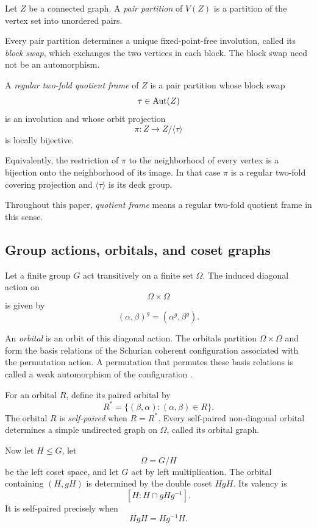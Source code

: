 Let \(Z\) be a connected graph. A \emph{pair partition} of \(V(Z)\) is a
partition of the vertex set into unordered pairs.

Every pair partition determines a unique fixed-point-free involution,
called its \emph{block swap}, which exchanges the two vertices in each
block. The block swap need not be an automorphism.

\begin{definition}
A \emph{regular two-fold quotient frame} of \(Z\) is a pair partition whose
block swap
\[
\tau\in\operatorname{Aut}(Z)
\]
is an involution and whose orbit projection
\[
\pi:
Z\longrightarrow Z/\langle\tau\rangle
\]
is locally bijective.
\end{definition}

Equivalently, the restriction of \(\pi\) to the neighborhood of every
vertex is a bijection onto the neighborhood of its image. In that case
\(\pi\) is a regular two-fold covering projection and
\(\langle\tau\rangle\) is its deck group.

Throughout this paper, \emph{quotient frame} means a regular two-fold
quotient frame in this sense.

\subsection{Group actions, orbitals, and coset graphs}

Let a finite group \(G\) act transitively on a finite set \(\Omega\).
The induced diagonal action on
\[
\Omega\times\Omega
\]
is given by
\[
(\alpha,\beta)^g
=
(\alpha^g,\beta^g).
\]

An \emph{orbital} is an orbit of this diagonal action. The orbitals
partition \(\Omega\times\Omega\) and form the basis relations of the
Schurian coherent configuration associated with the permutation action.
A permutation that permutes these basis relations is called a weak
automorphism of the configuration
\cite{Higman1975CoherentConfigurations,
Cameron2003CoherentConfigurations,
Eberhard2023HammingSandwiches}.

For an orbital \(R\), define its paired orbital by
\[
R^{*}
=
\{
(\beta,\alpha):
(\alpha,\beta)\in R
\}.
\]
The orbital \(R\) is \emph{self-paired} when \(R=R^{*}\). Every
self-paired non-diagonal orbital determines a simple undirected graph on
\(\Omega\), called its orbital graph.

Now let \(H\leq G\), let
\[
\Omega=G/H
\]
be the left coset space, and let \(G\) act by left multiplication. The
orbital containing \((H,gH)\) is determined by the double coset \(HgH\).
Its valency is
\[
[H:H\cap gHg^{-1}].
\]
It is self-paired precisely when
\[
HgH=Hg^{-1}H.
\]


